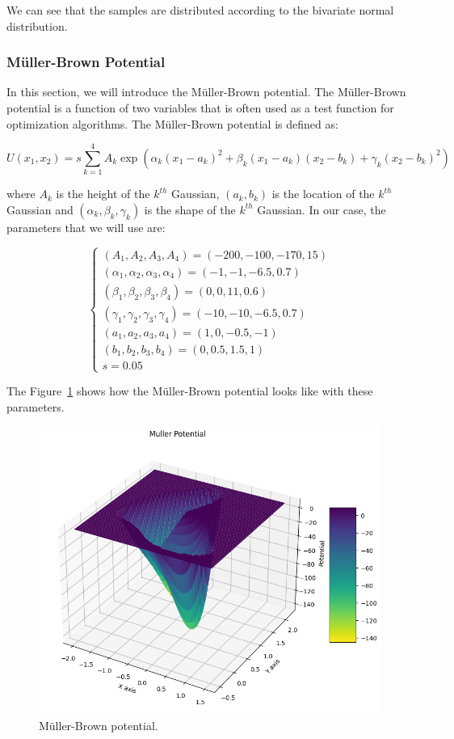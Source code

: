 \documentclass{article}
\begin{document}
We can see that the samples are distributed according to the bivariate normal distribution.


\subsubsection{Müller-Brown Potential}

In this section, we will introduce the Müller-Brown potential. The Müller-Brown potential is a function of two variables that is often used as a test function for optimization algorithms. The Müller-Brown potential is defined as:

\[
	U(x_1, x_2) = s \sum_{k=1}^4 A_k \exp(\alpha_k(x_1 - a_k)^2 + \beta_k(x_1 - a_k)(x_2 - b_k) + \gamma_k(x_2 - b_k)^2)
\]

where \(A_k\) is the height of the \(k^{th}\) Gaussian, \((a_k, b_k)\) is the location of the \(k^{th}\) Gaussian and \((\alpha_k, \beta_k, \gamma_k)\) is the shape of the \(k^{th}\) Gaussian. In our case, the parameters that we will use are:

\[
	\begin{cases}
		(A_1, A_2, A_3, A_4) = (-200, -100, -170, 15) \\
		(\alpha_1, \alpha_2, \alpha_3, \alpha_4) = (-1, -1, -6.5, 0.7) \\
		(\beta_1, \beta_2, \beta_3, \beta_4) = (0, 0, 11, 0.6) \\
		(\gamma_1, \gamma_2, \gamma_3, \gamma_4) = (-10, -10, -6.5, 0.7) \\
		(a_1, a_2, a_3, a_4) = (1, 0, -0.5, -1) \\
		(b_1, b_2, b_3, b_4) = (0, 0.5, 1.5, 1) \\
		s = 0.05
	\end{cases}
\]

The Figure~\ref{fig:mullerbrown} shows how the Müller-Brown potential looks like with these parameters.

\begin{figure}[H]
	\centering
	\includegraphics[width=0.5\linewidth]{./Figures/MCMC/mullerbrown.png}
	\caption{Müller-Brown potential.}
	\label{fig:mullerbrown}
\end{figure}
\end{document}
